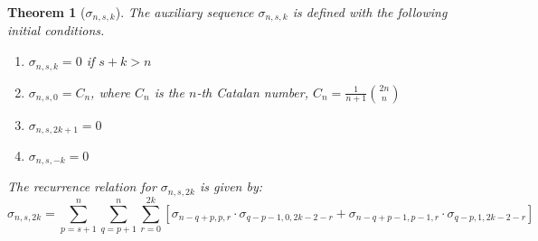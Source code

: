 \documentclass[12pt,reqno]{amsart}
\theoremstyle{plain} %
\newtheorem{theorem}{Theorem}[section]
\theoremstyle{remark}
\theoremstyle{definition}
\begin{document}
\begin{theorem}[\(\sigma_{n, s, k}\)]
The auxiliary sequence \(\sigma_{n, s, k}\) is defined with the following initial conditions. 
\begin{enumerate}
    \item \(\sigma_{n, s, k} = 0\) if \(s + k > n\)
    \item \(\sigma_{n, s, 0} = C_n\), where \(C_n\) is the \(n\)-th Catalan number, \(C_n = \frac{1}{n + 1} \binom{2n}{n}\)
    \item \(\sigma_{n, s, 2k + 1} = 0\)
    \item \(\sigma_{n, s, -k} = 0\)
\end{enumerate}

The recurrence relation for \(\sigma_{n, s, 2k}\) is given by:
\begin{equation}
\sigma_{n, s, 2k} = 
\sum_{p = s + 1}^{n} 
\sum_{q = p + 1}^{n}
\sum_{r = 0}^{2k}
\left[
\sigma_{n - q + p, p, r} \cdot \sigma_{q - p - 1, 0, 2k - 2 - r}
+ 
\sigma_{n - q + p - 1, p - 1, r} \cdot \sigma_{q - p, 1, 2k - 2 - r}
\right]
\end{equation}
\end{theorem}
\end{document}
